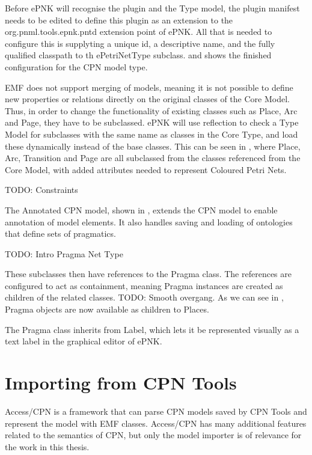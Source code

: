 Before ePNK will recognise the plugin and the Type model, the plugin manifest
needs to be edited to define this plugin as an extension to the
org.pnml.tools.epnk.pntd extension point of ePNK. All that is needed to
configure this is supplyting a unique id, a descriptive name, and the fully
qualified classpath to th ePetriNetType subclass.  and
 shows the finished configuration for the CPN model
type. 

EMF does not support merging of models, meaning it is not possible to define new
properties or relations directly on the original classes of the Core Model.
Thus, in order to change the functionality of existing classes such as Place,
Arc and Page, they have to be subclassed. ePNK will use reflection to check a
Type Model for subclasses with the same name as classes in the Core Type, and
load these dynamically instead of the base classes.
This can be seen in , where Place, Arc, Transition and Page are all
subclassed from the classes referenced from the Core Model, with added
attributes needed to represent Coloured Petri Nets.

TODO: Constraints

The Annotated CPN model, shown in , extends the CPN
model to enable annotation of model elements. It also handles saving and loading
of ontologies that define sets of pragmatics.

TODO: Intro Pragma Net Type

These subclasses then have references to the Pragma class. The references are
configured to act as containment, meaning Pragma instances are created as
children of the related classes. TODO: Smooth overgang. As we can see in
, Pragma objects are now available as children to Places.


The Pragma class inherits from Label, which lets it be represented visually as a
text label in the graphical editor of ePNK.

\section{Importing from CPN Tools}
Access/CPN is a framework that can parse CPN models saved by CPN Tools and
represent the model with EMF classes. Access/CPN has many additional features
related to the semantics of CPN, but only the model importer is of relevance for
the work in this thesis.

